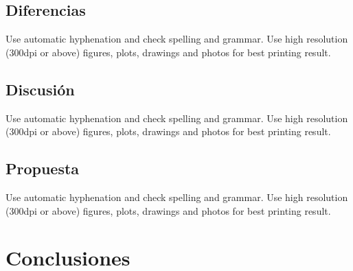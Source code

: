 \subsection{Diferencias}
Use automatic hyphenation and check spelling and grammar. Use high resolution (300dpi or above) figures, plots, drawings and photos for best printing result.

\subsection{Discusión}
Use automatic hyphenation and check spelling and grammar. Use high resolution (300dpi or above) figures, plots, drawings and photos for best printing result.

\subsection{Propuesta}
Use automatic hyphenation and check spelling and grammar. Use high resolution (300dpi or above) figures, plots, drawings and photos for best printing result.

\section{Conclusiones}